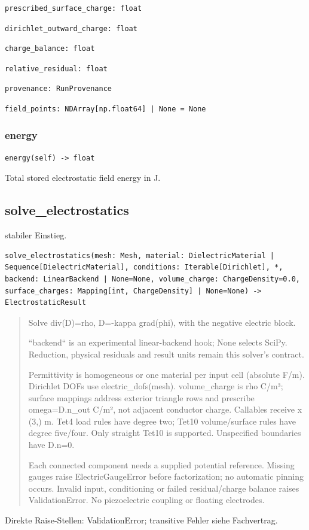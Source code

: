 \begin{lstlisting}
prescribed_surface_charge: float
\end{lstlisting}
\begin{lstlisting}
dirichlet_outward_charge: float
\end{lstlisting}
\begin{lstlisting}
charge_balance: float
\end{lstlisting}
\begin{lstlisting}
relative_residual: float
\end{lstlisting}
\begin{lstlisting}
provenance: RunProvenance
\end{lstlisting}
\begin{lstlisting}
field_points: NDArray[np.float64] | None = None
\end{lstlisting}
\subsubsection*{energy}
\begin{lstlisting}
energy(self) -> float
\end{lstlisting}
Total stored electrostatic field energy in J.
\subsection{solve\_electrostatics}
stabiler Einstieg.
\begin{lstlisting}
solve_electrostatics(mesh: Mesh, material: DielectricMaterial | Sequence[DielectricMaterial], conditions: Iterable[Dirichlet], *, backend: LinearBackend | None=None, volume_charge: ChargeDensity=0.0, surface_charges: Mapping[int, ChargeDensity] | None=None) -> ElectrostaticResult
\end{lstlisting}
\begin{quote}
Solve div(D)=rho, D=-kappa grad(phi), with the negative electric block.\par ``backend`` is an experimental linear-backend hook; None selects SciPy. Reduction, physical residuals and result units remain this solver's contract.\par Permittivity is homogeneous or one material per input cell (absolute F/m). Dirichlet DOFs use electric\_dofs(mesh). volume\_charge is rho C/m³; surface mappings address exterior triangle rows and prescribe omega=D.n\_out C/m², not adjacent conductor charge. Callables receive x (3,) m. Tet4 load rules have degree two; Tet10 volume/surface rules have degree five/four. Only straight Tet10 is supported. Unspecified boundaries have D.n=0.\par Each connected component needs a supplied potential reference. Missing gauges raise ElectricGaugeError before factorization; no automatic pinning occurs. Invalid input, conditioning or failed residual/charge balance raises ValidationError. No piezoelectric coupling or floating electrodes.
\end{quote}
Direkte Raise-Stellen: ValidationError; transitive Fehler siehe Fachvertrag.
